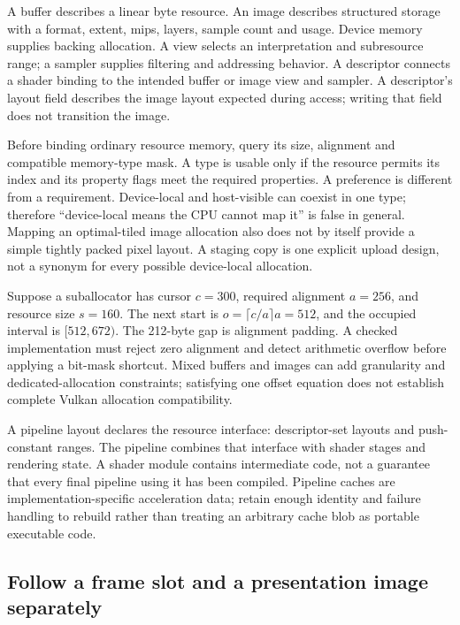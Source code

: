 A buffer describes a linear byte resource. An image describes structured storage with a format, extent, mips, layers, sample count and usage. Device memory supplies backing allocation. A view selects an interpretation and subresource range; a sampler supplies filtering and addressing behavior. A descriptor connects a shader binding to the intended buffer or image view and sampler. A descriptor's layout field describes the image layout expected during access; writing that field does not transition the image.

Before binding ordinary resource memory, query its size, alignment and compatible memory-type mask. A type is usable only if the resource permits its index and its property flags meet the required properties. A preference is different from a requirement. Device-local and host-visible can coexist in one type; therefore ``device-local means the CPU cannot map it'' is false in general. Mapping an optimal-tiled image allocation also does not by itself provide a simple tightly packed pixel layout. A staging copy is one explicit upload design, not a synonym for every possible device-local allocation.

Suppose a suballocator has cursor \(c=300\), required alignment \(a=256\), and resource size \(s=160\). The next start is \(o=\lceil c/a\rceil a=512\), and the occupied interval is \([512,672)\). The 212-byte gap is alignment padding. A checked implementation must reject zero alignment and detect arithmetic overflow before applying a bit-mask shortcut. Mixed buffers and images can add granularity and dedicated-allocation constraints; satisfying one offset equation does not establish complete Vulkan allocation compatibility.

A pipeline layout declares the resource interface: descriptor-set layouts and push-constant ranges. The pipeline combines that interface with shader stages and rendering state. A shader module contains intermediate code, not a guarantee that every final pipeline using it has been compiled. Pipeline caches are implementation-specific acceleration data; retain enough identity and failure handling to rebuild rather than treating an arbitrary cache blob as portable executable code.

\subsection{Follow a frame slot and a presentation image separately}\label{05-engine-i-ch019-follow-a-frame-slot-and-a-presentation-image-separately}

